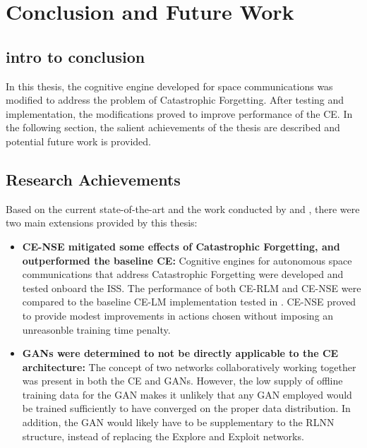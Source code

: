 \chapter{Conclusion and Future Work} \label{ch:conclusion}

\section{intro to conclusion}
\par In this thesis, the cognitive engine developed for space communications was modified to address the problem of Catastrophic Forgetting. After testing and implementation, the modifications proved to improve performance of the CE. In the following section, the salient achievements of the thesis are described and potential future work is provided.

\section{Research Achievements}
\par Based on the current state-of-the-art and the work conducted by \cite{paulo_theory_paper} and \cite{tim_implementation_paper}, there were two main extensions provided by this thesis:
\begin{itemize}
	\item \textbf{CE-NSE mitigated some effects of Catastrophic Forgetting, and outperformed the baseline CE:} Cognitive engines for autonomous space communications that address Catastrophic Forgetting were developed and tested onboard the ISS. The performance of both CE-RLM and CE-NSE were compared to the baseline CE-LM implementation tested in \cite{tim_implementation_paper}. CE-NSE proved to provide modest improvements in actions chosen without imposing an unreasonble training time penalty.

	\item \textbf{GANs were determined to not be directly applicable to the CE architecture: } The concept of two networks collaboratively working together was present in both the CE and GANs. However, the low supply of offline training data for the GAN makes it unlikely that any GAN employed would be trained sufficiently to have converged on the proper data distribution. In addition, the GAN would likely have to be supplementary to the RLNN structure, instead of replacing the Explore and Exploit networks. 
\end{itemize}

